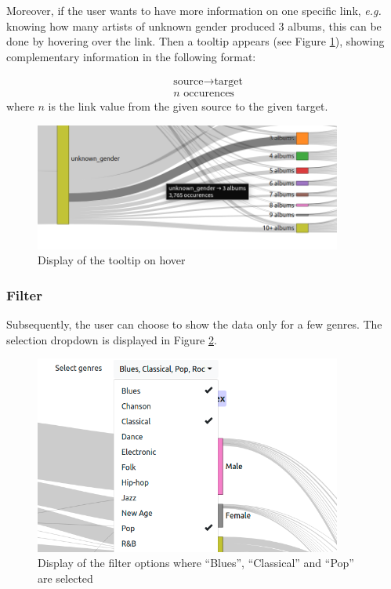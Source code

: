 \documentclass[a4paper, 11pt, oneside]{article}
\newcommand{\eg}{\textit{e.g. }}
\begin{document}
Moreover, if the user wants to have more information on one specific link, \eg knowing how many artists of unknown gender produced 3 albums, this can be done by hovering over the link. Then a tooltip appears (see Figure \ref{fig:joris_sankey_tooltip}), showing complementary information in the following format:

\begin{align*}
     & \text{source} \to \text{target} \\
     & n \text{ occurences}
\end{align*}
where \(n\) is the link value from the given source to the given target.

\begin{figure}[ht]
    \centering
    \includegraphics[width=0.9\textwidth]{Images/joris-sankey-tooltip.png}
    \caption{Display of the tooltip on hover}
    \label{fig:joris_sankey_tooltip}
\end{figure}

\subsubsection{Filter}

Subsequently, the user can choose to show the data only for a few genres. The selection dropdown is displayed in Figure \ref{fig:joris_sankey_filter-options}.

\begin{figure}[ht]
    \centering
    \includegraphics[width=0.9\textwidth]{Images/joris-sankey-filter-options.png}
    \caption{Display of the filter options where ``Blues'', ``Classical'' and ``Pop'' are selected}
    \label{fig:joris_sankey_filter-options}
\end{figure}
\end{document}

